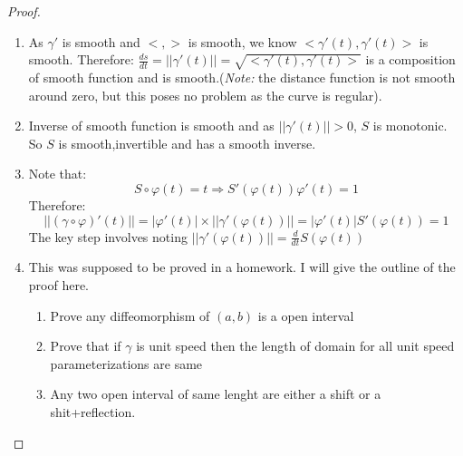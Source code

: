 \documentclass[oneside]{book}\twocolumn
\begin{document}
\begin{proof}
\begin{enumerate}
    \item As $\gamma'$ is smooth and $<,>$ is smooth, we know $<\gamma'(t),\gamma'(t)>$ is smooth. Therefore:
    $\frac{ds}{dt}=||\gamma'(t)||=\sqrt{<\gamma'(t),\gamma'(t)>}$ is a composition of smooth function and is smooth.(\textit{Note:} the distance function is not smooth around zero, but this poses no problem as the curve is regular).
    \item Inverse of smooth function is smooth and as $||\gamma'(t)||>0$, $S$ is monotonic. So $S$ is smooth,invertible and has a smooth inverse.
    \item Note that:
    $$S\circ \varphi (t)=t\Rightarrow S'(\varphi(t))\varphi'(t)=1$$
    Therefore:
    $$||(\gamma\circ\varphi)'(t)||=|\varphi'(t)|\times ||\gamma'(\varphi(t)) ||=|\varphi'(t)|S'(\varphi(t))=1$$
    The key step involves noting $||\gamma'(\varphi(t))||=\frac{d}{dt}S(\varphi(t))$
    \item This was supposed to be proved in a homework. I will give the outline of the proof here.
    \begin{enumerate}
        \item Prove any diffeomorphism of $(a,b)$ is a open interval
        \item Prove that if $\gamma$ is unit speed then the length of domain for all unit speed parameterizations are same
        \item Any two open interval of same lenght are either a shift or a shit+reflection.
    \end{enumerate}
\end{enumerate}
\end{proof}
\end{document}
